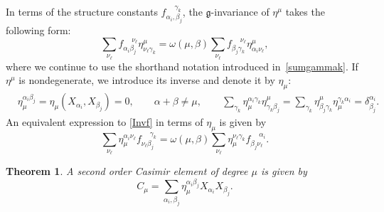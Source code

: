 \documentclass[pdftex]{sigma}
\numberwithin{equation}{section}
\newtheorem{Theorem}{Theorem}[section]
\theoremstyle{definition}
\def\g{\mathfrak{g}}
\begin{document}
In terms of the structure constants $f_{\alpha_i, \beta_j}^{\quad\ \gamma_k}$, the $\g$-invariance of $\eta^{\mu}$ takes the following form:
\begin{equation}
	\sum_{\nu_{\ell}}
	f_{\alpha_i \beta_j}^{\quad \ \nu_{\ell}} \eta^{\mu}_{\nu_{\ell}\gamma_k}
	=
	\omega(\mu,\beta)
	\sum_{\nu_{\ell}}
	f_{\beta_j \gamma_k}^{\quad \ \nu_{\ell}} \eta^{\mu}_{\alpha_i \nu_{\ell}},
	\label{Invf}
\end{equation}
where we continue to use the shorthand notation introduced in~\eqref{sumgammak}.
If $\eta^{\mu}$ is nondegenerate, we introduce its inverse and denote it by $ \eta_{\mu}$:
\begin{align*}
	 &\eta_{\mu}^{\alpha_i \beta_j}=\eta_{\mu}(X_{\alpha_i}, X_{\beta_j}) = 0,\qquad \alpha + \beta \neq \mu,
	\qquad
	 \sum_{\gamma_k } \eta_{\mu}^{\alpha_i \gamma_k} \eta^{\mu}_{\gamma_k \beta_j}=\sum_{\gamma_k}
	\eta^{\mu}_{\beta_j \gamma_k} \eta_{\mu}^{\gamma_k \alpha_i} = \delta^{\alpha_i}_{\beta_j}.
\end{align*}
An equivalent expression to \eqref{Invf} in terms of $\eta_{\mu}$ is given by
\begin{equation}
	\sum_{\nu_{\ell}}
	\eta_{\mu}^{\alpha_i \nu_{\ell}} f_{\nu_{\ell} \beta_j}^{\quad \ \gamma_k}
	= \omega(\mu,\beta)
	\sum_{\nu_{\ell}}
	\eta_{\mu}^{\nu_{\ell} \gamma_k} f_{\beta_j \nu_{\ell}}^{\quad\ \alpha_i}.
	\label{Invf2}
\end{equation}

\begin{Theorem}
	A second order Casimir element of degree $\mu$ is given by
	\begin{equation*}
		C_{\mu} = \sum_{\alpha_i,\beta_j} \eta_{\mu}^{\alpha_i \beta_j} X_{\alpha_i} X_{\beta_j}.
	\end{equation*}
\end{Theorem}
\end{document}
